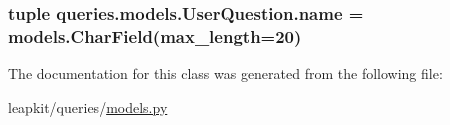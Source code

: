 \hypertarget{classqueries_1_1models_1_1_user_question_aa0415c4eaa474d4cecbd7909e47aa6c0}{
\subsubsection[{name}]{\setlength{\rightskip}{0pt plus 5cm}tuple queries.\-models.\-User\-Question.\-name = models.\-Char\-Field(max\-\_\-length=20)\hspace{0.3cm}{\ttfamily [static]}}}\label{classqueries_1_1models_1_1_user_question_aa0415c4eaa474d4cecbd7909e47aa6c0}


The documentation for this class was generated from the following file\-:\begin{DoxyCompactItemize}
\item 
leapkit/queries/\hyperlink{queries_2models_8py}{models.\-py}\end{DoxyCompactItemize}
